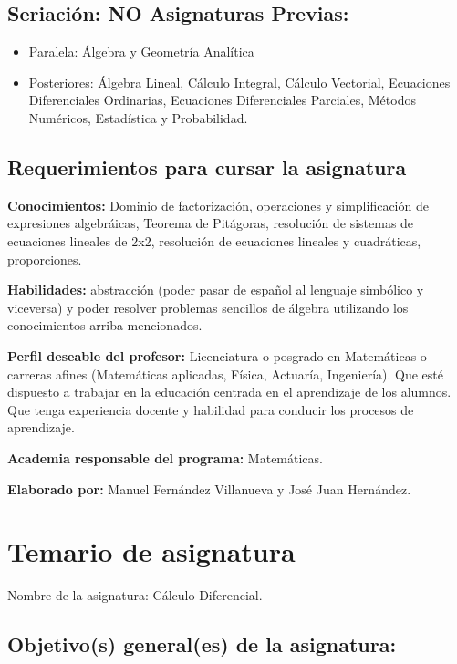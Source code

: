 \documentclass[]{book}
\begin{document}
\subsection*{Seriación: NO  Asignaturas     Previas: }

\begin{itemize}
\item
  Paralela: Álgebra y Geometría Analítica
\item
  Posteriores: Álgebra Lineal, Cálculo Integral, Cálculo Vectorial,
  Ecuaciones Diferenciales Ordinarias, Ecuaciones Diferenciales
  Parciales, Métodos Numéricos, Estadística y Probabilidad.
\end{itemize}

\subsection*{Requerimientos para cursar la asignatura }

\textbf{Conocimientos:} Dominio de factorización, operaciones y
simplificación de expresiones algebráicas, Teorema de Pitágoras,
resolución de sistemas de ecuaciones lineales de 2x2, resolución de
ecuaciones lineales y cuadráticas, proporciones.

\textbf{Habilidades:} abstracción (poder pasar de español al lenguaje
simbólico y viceversa) y poder resolver problemas sencillos de álgebra
utilizando los conocimientos arriba mencionados.

\textbf{Perfil deseable del profesor:} Licenciatura o posgrado en
Matemáticas o carreras afines (Matemáticas aplicadas, Física, Actuaría,
Ingeniería). Que esté dispuesto a trabajar en la educación centrada en
el aprendizaje de los alumnos. Que tenga experiencia docente y habilidad
para conducir los procesos de aprendizaje.

\textbf{Academia responsable del programa:} Matemáticas.

\textbf{Elaborado por: } Manuel Fernández Villanueva y José Juan
Hernández.

\section*{Temario de asignatura }

Nombre de la asignatura: Cálculo Diferencial.

\subsection*{Objetivo(s) general(es) de la asignatura:}
\end{document}
